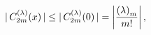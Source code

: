 \[|\mathop{C^{(\lambda)}_{2m}\/}\nolimits\!\left(x\right)|\leq|\mathop{C^{(%
\lambda)}_{2m}\/}\nolimits\!\left(0\right)|=\left|\frac{\left(\lambda\right)_{%
m}}{m!}\right|,\]